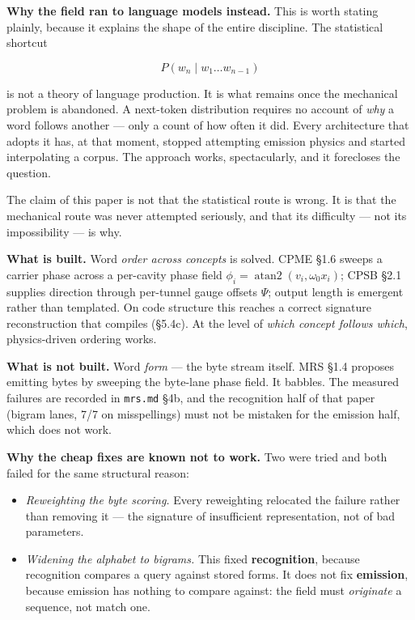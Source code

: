 \documentclass[
  11pt,
  a4paper,
]{article}
\providecommand{\tightlist}{%
  \setlength{\itemsep}{0pt}\setlength{\parskip}{0pt}}
\begin{document}
\textbf{Why the field ran to language models instead.} This is worth
stating plainly, because it explains the shape of the entire discipline.
The statistical shortcut

\[
P(w_n \mid w_1 \ldots w_{n-1})
\]

is not a theory of language production. It is what remains once the
mechanical problem is abandoned. A next-token distribution requires no
account of \emph{why} a word follows another --- only a count of how
often it did. Every architecture that adopts it has, at that moment,
stopped attempting emission physics and started interpolating a corpus.
The approach works, spectacularly, and it forecloses the question.

The claim of this paper is not that the statistical route is wrong. It
is that the mechanical route was never attempted seriously, and that its
difficulty --- not its impossibility --- is why.

\textbf{What is built.} Word \emph{order across concepts} is solved.
CPME §1.6 sweeps a carrier phase across a per-cavity phase field
\(\phi_i = \operatorname{atan2}(v_i, \omega_0 x_i)\); CPSB §2.1 supplies
direction through per-tunnel gauge offsets \(\Psi\); output length is
emergent rather than templated. On code structure this reaches a correct
signature reconstruction that compiles (§5.4c). At the level of
\emph{which concept follows which}, physics-driven ordering works.

\textbf{What is not built.} Word \emph{form} --- the byte stream itself.
MRS §1.4 proposes emitting bytes by sweeping the byte-lane phase field.
It babbles. The measured failures are recorded in \texttt{mrs.md} §4b,
and the recognition half of that paper (bigram lanes, 7/7 on
misspellings) must not be mistaken for the emission half, which does not
work.

\textbf{Why the cheap fixes are known not to work.} Two were tried and
both failed for the same structural reason:

\begin{itemize}
\tightlist
\item
  \emph{Reweighting the byte scoring.} Every reweighting relocated the
  failure rather than removing it --- the signature of insufficient
  representation, not of bad parameters.
\item
  \emph{Widening the alphabet to bigrams.} This fixed
  \textbf{recognition}, because recognition compares a query against
  stored forms. It does not fix \textbf{emission}, because emission has
  nothing to compare against: the field must \emph{originate} a
  sequence, not match one.
\end{itemize}
\end{document}
